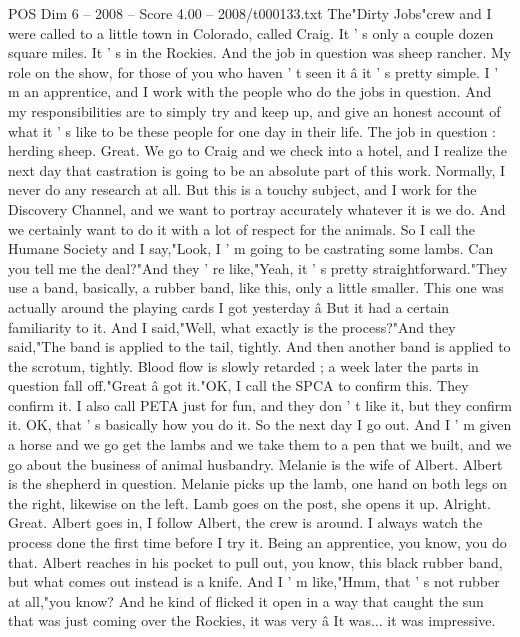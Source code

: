 \begin{textsample}{POS Dim 6 – 2008 – Score 4.00 – 2008/t000133.txt}  \label{ex:f6_pos_013}
The"Dirty Jobs"crew and I were called to a little town in Colorado, called Craig.
It ' s only a couple dozen square miles.
It ' s in the Rockies.
And the job in question was sheep rancher.
My role on the show, for those of you who haven ' t seen it â it ' s pretty simple.
I ' m an apprentice, and I work with the people who do the jobs in question.
And my responsibilities are to simply try and keep up, and give an honest account of what it ' s like to be these people for one day in their life.
The job in question : herding sheep.
Great.
We go to Craig and we check into a hotel, and I realize the next day that castration is going to be an absolute part of this work.
Normally, I never do any research at all.
But this is a touchy subject, and I work for the Discovery Channel, and we want to portray accurately whatever it is we do.
And we certainly want to do it with a lot of respect for the animals.
So I call the Humane Society and I say,"Look, I ' m going to be castrating some lambs.
Can you tell me the deal?"And they ' re like,"Yeah, it ' s pretty straightforward."They use a band, basically, a rubber band, like this, only a little smaller.
This one was actually around the playing cards I got yesterday â But it had a certain familiarity to it.
And I said,"Well, what exactly is the process?"And they said,"The band is applied to the tail, tightly.
And then another band is applied to the scrotum, tightly.
Blood flow is slowly retarded ; a week later the parts in question fall off."Great â got it."OK, I call the SPCA to confirm this.
They confirm it.
I also call PETA just for fun, and they don ' t like it, but they confirm it.
OK, that ' s basically how you do it.
So the next day I go out.
And I ' m given a horse and we go get the lambs and we take them to a pen that we built, and we go about the business of animal husbandry.
Melanie is the wife of Albert.
Albert is the shepherd in question.
Melanie picks up the lamb, one hand on both legs on the right, likewise on the left.
Lamb goes on the post, she opens it up.
Alright.
Great.
Albert goes in, I follow Albert, the crew is around.
I always watch the process done the first time before I try it.
Being an apprentice, you know, you do that.
Albert reaches in his pocket to pull out, you know, this black rubber band, but what comes out instead is a knife.
And I ' m like,"Hmm, that ' s not rubber at all,"you know?
And he kind of flicked it open in a way that caught the sun that was just coming over the Rockies, it was very â It was... it was impressive.

\end{textsample}
